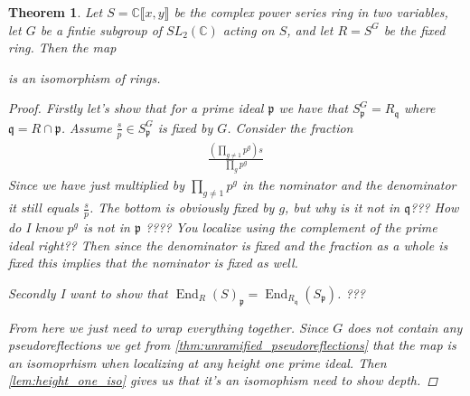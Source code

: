 \documentclass[11pt, a4paper, english]{article}
\numberwithin{prop}{section}
\numberwithin{lemma}{section}
\newtheorem{theorem}{Theorem}
\numberwithin{theorem}{section}
\numberwithin{defin}{section}
\numberwithin{example}{section}
\newcommand{\C}{\mathbb{C}}
\DeclareMathOperator{\End}{End}
\begin{document}
\begin{theorem}
Let $S = \C \llbracket x, y \rrbracket$ be the complex power series ring in two variables, let $G$ be  a fintie subgroup of $SL_2(\C)$ acting on $S$, and let $R = S^G$ be the fixed ring. Then the map
\begin{center}
\end{center}
is an isomorphism of rings.
\begin{proof}
Firstly let's show that for a prime ideal $\mathfrak{p}$ we have that $S_\mathfrak{p}^G = R_\mathfrak{q}$ where $\mathfrak{q} = R \cap \mathfrak{p}$. Assume $\frac{s}{p} \in S_\mathfrak{p}^G$ is fixed by $G$. Consider the fraction
\begin{align*}
\frac{ \left( \prod_{g \neq 1} p^g \right) s}{\prod_g p^g}
\end{align*}
Since we have just multiplied by $\prod_{g \neq 1} p^g$ in the nominator and the denominator it still equals $\frac{s}{p}$. The bottom is obviously fixed by $g$, but why is it not in $\mathfrak{q}$??? 
{\color{red} How do I know $p^g$ is not in $\mathfrak{p}$ ???? You localize using the complement of the prime ideal right??} Then since the denominator is fixed and the fraction as a whole is fixed this implies that the nominator is fixed as well.

Secondly I want to show that $\End_R(S)_\mathfrak{p} = \End_{R_\mathfrak{q}}(S_\mathfrak{p})$. {\color{red} ???}

From here we just need to wrap everything together. Since $G$ does not contain any pseudoreflections we get from \cref{thm:unramified_pseudoreflections} that the map is an isomoprhism when localizing at any height one prime ideal. Then \cref{lem:height_one_iso} gives us that it's an isomophism {\color{red} need to show depth}.
\end{proof}
\end{theorem}
\end{document}
